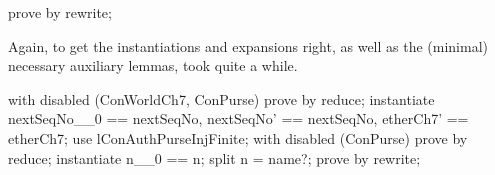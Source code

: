 \begin{LDCheck}\begin{zproof}
    prove by rewrite;
\end{zproof}\end{LDCheck}

\begin{LPScript}\end{LPScript}

Again, to get the instantiations and expansions right, as well
as the (minimal) necessary auxiliary lemmas, took quite a while.
%
\begin{LPScript}\begin{zproof}[tConcIncreaseOkayPRE]
    with disabled (ConWorldCh7, ConPurse) prove by reduce;
    instantiate nextSeqNo\_\_0 == nextSeqNo,
        nextSeqNo' == nextSeqNo, etherCh7' == etherCh7;
    use lConAuthPurseInjFinite;
    with disabled (ConPurse) prove by reduce;
    instantiate n\_\_0 == n;
    split n = name?;
    prove by rewrite;
\end{zproof}\end{LPScript}

